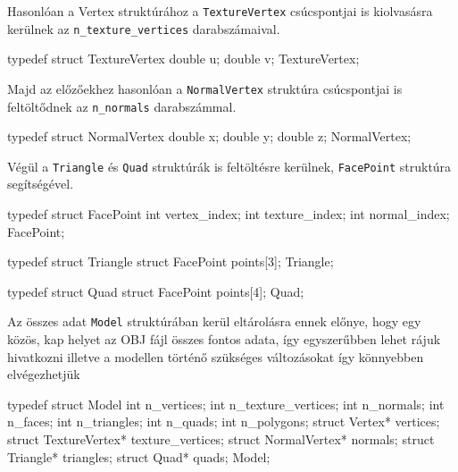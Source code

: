Hasonlóan a Vertex struktúrához a \texttt{TextureVertex} csúcspontjai is kiolvasásra kerülnek az \texttt{n\_texture\_vertices} darabszámaival.
\begin{python}
typedef struct TextureVertex
{
    double u;
    double v;
}TextureVertex;
\end{python}
\bigskip

Majd az előzőekhez hasonlóan a \texttt{NormalVertex}  struktúra csúcspontjai is feltöltődnek az \texttt{n\_normals} darabszámmal.
\begin{python}
typedef struct NormalVertex
{
    double x;
    double y;
    double z;
}NormalVertex;
\end{python}
\bigskip
\newpage
Végül a \texttt{Triangle} és \texttt{Quad} struktúrák is feltöltésre kerülnek, \texttt{FacePoint} struktúra segítségével.
\begin{python}
typedef struct FacePoint
{
    int vertex_index;
    int texture_index;
    int normal_index;
} FacePoint;

typedef struct Triangle
{
    struct FacePoint points[3];
} Triangle;

typedef struct Quad
{
    struct FacePoint points[4];
} Quad;
\end{python}
\bigskip

Az összes adat  \texttt{Model} struktúrában kerül eltárolásra ennek előnye, hogy egy közös, kap helyet az OBJ fájl összes fontos adata, így egyszerűbben lehet rájuk hivatkozni illetve a modellen történő szükséges változásokat  így könnyebben elvégezhetjük
\begin{python}
typedef struct Model
{
    int n_vertices;
    int n_texture_vertices;
    int n_normals;
    int n_faces;
    int n_triangles;
    int n_quads;
    int n_polygons;
    struct Vertex* vertices;
    struct TextureVertex* texture_vertices;
    struct NormalVertex* normals;
    struct Triangle* triangles;
    struct Quad* quads;
}Model;
\end{python}
\newpage
{}

